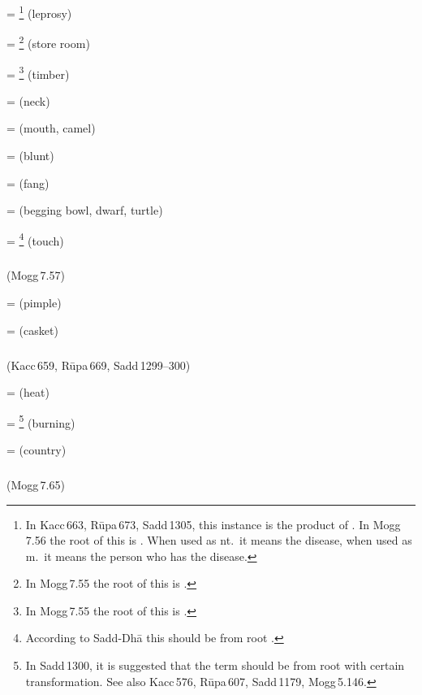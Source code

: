  = \footnote{In Kacc\,663, R\=upa\,673, Sadd\,1305, this instance is the product of . In Mogg\,7.56 the root of this is . When used as nt.\ it means the disease, when used as m.\ it means the person who has the disease.} (leprosy)\par
{} = \footnote{In Mogg\,7.55 the root of this is .} (store room)\par
{} = \footnote{In Mogg\,7.55 the root of this is .} (timber)\par
{} =  (neck)\par
{} =  (mouth, camel)\par
{} =  (blunt)\par
{} =  (fang)\par
{} =  (begging bowl, dwarf, turtle)\par
{} = \footnote{According to Sadd-Dh\=a this should be from root .} (touch)\par

\subparagraph*{} (Mogg\,7.57)\label{pacckx:adndda}

 =  (pimple)\par
{} =  (casket)\par

\subparagraph*{} (Kacc\,659, R\=upa\,669, Sadd\,1299--300)\label{pacckx:ddha}\label{pacckx:ddddha}\label{pacckx:dtha2}\label{pacckx:dtdtha}

 =  (heat)\par
{} = \footnote{In Sadd\,1300, it is suggested that the term should be from root  with certain transformation. See also Kacc\,576, R\=upa\,607, Sadd\,1179, Mogg\,5.146.} (burning)\par
{} =  (country)\par

\subparagraph*{} (Mogg\,7.65)\label{pacckx:dna2}

